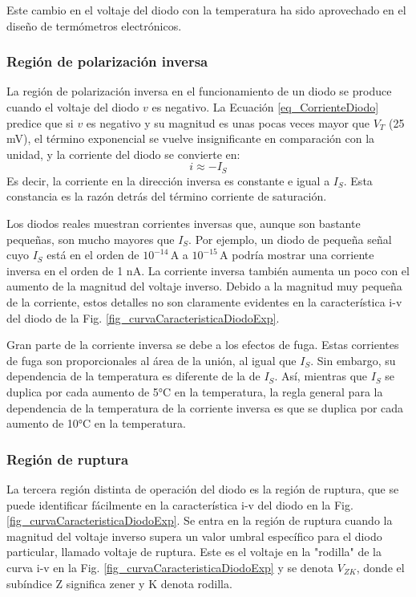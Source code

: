 Este cambio en el voltaje del diodo con la temperatura ha sido aprovechado en el diseño de termómetros electrónicos.

\subsubsection{Región de polarización inversa}

La región de polarización inversa en el funcionamiento de un diodo se produce cuando el voltaje del diodo \( v \) es negativo. La Ecuación \ref{eq_CorrienteDiodo} predice que si \( v \) es negativo y su magnitud es unas pocas veces mayor que \( V_T \) (25 mV), el término exponencial se vuelve insignificante en comparación con la unidad, y la corriente del diodo se convierte en:
\[ i \approx -I_S \]
Es decir, la corriente en la dirección inversa es constante e igual a \( I_S \). Esta constancia es la razón detrás del término corriente de saturación.

Los diodos reales muestran corrientes inversas que, aunque son bastante pequeñas, son mucho mayores que \( I_S \). Por ejemplo, un diodo de pequeña señal cuyo \( I_S \) está en el orden de \( 10^{-14} \, \text{A} \) a \( 10^{-15} \, \text{A} \) podría mostrar una corriente inversa en el orden de 1 nA. La corriente inversa también aumenta un poco con el aumento de la magnitud del voltaje inverso. Debido a la magnitud muy pequeña de la corriente, estos detalles no son claramente evidentes en la característica i-v del diodo de la Fig. \ref{fig_curvaCaracteristicaDiodoExp}.

Gran parte de la corriente inversa se debe a los efectos de fuga. Estas corrientes de fuga son proporcionales al área de la unión, al igual que \( I_S \). Sin embargo, su dependencia de la temperatura es diferente de la de \( I_S \). Así, mientras que \( I_S \) se duplica por cada aumento de 5°C en la temperatura, la regla general para la dependencia de la temperatura de la corriente inversa es que se duplica por cada aumento de 10°C en la temperatura.

\subsubsection{Región de ruptura}

La tercera región distinta de operación del diodo es la región de ruptura, que se puede identificar fácilmente en la característica i-v del diodo en la Fig. \ref{fig_curvaCaracteristicaDiodoExp}. Se entra en la región de ruptura cuando la magnitud del voltaje inverso supera un valor umbral específico para el diodo particular, llamado voltaje de ruptura. Este es el voltaje en la "rodilla" de la curva i-v en la Fig. \ref{fig_curvaCaracteristicaDiodoExp} y se denota \( V_{ZK} \), donde el subíndice Z significa zener y K denota rodilla.

